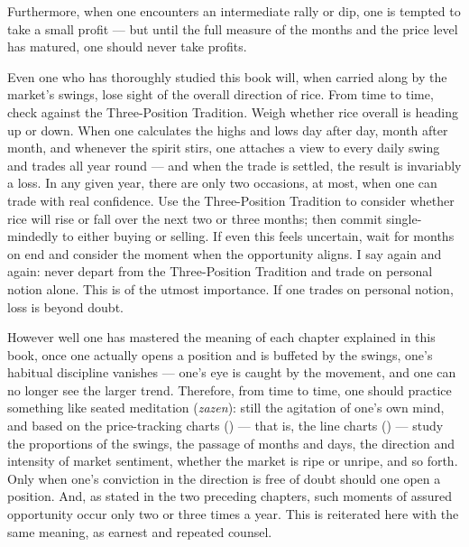 Furthermore, when one encounters an intermediate rally or dip, one is
tempted to take a small profit --- but until the full measure of the
months and the price level has matured, one should never take profits.


\begin{sokyubox}
{\small\itshape\color{sokyubar} }

\medskip
Even one who has thoroughly studied this book will, when carried along by
the market's swings, lose sight of the overall direction of rice. From
time to time, check against the Three-Position Tradition. Weigh whether
rice overall is heading up or down. When one calculates the highs and
lows day after day, month after month, and whenever the spirit stirs, one
attaches a view to every daily swing and trades all year round --- and
when the trade is settled, the result is invariably a loss. In any given
year, there are only two occasions, at most, when one can trade with real
confidence. Use the Three-Position Tradition to consider whether rice
will rise or fall over the next two or three months; then commit
single-mindedly to either buying or selling. If even this feels
uncertain, wait for months on end and consider the moment when the
opportunity aligns. I say again and again: never depart from the
Three-Position Tradition and trade on personal notion alone. This is of
the utmost importance. If one trades on personal notion, loss is beyond
doubt.
\end{sokyubox}

\commentary
However well one has mastered the meaning of each chapter explained in
this book, once one actually opens a position and is buffeted by the
swings, one's habitual discipline vanishes --- one's eye is caught by the
movement, and one can no longer see the larger trend. Therefore, from
time to time, one should practice something like seated meditation
(\textit{zazen}): still the agitation of one's own mind, and based on
the price-tracking charts () --- that is, the
line charts () --- study the proportions of the
swings, the passage of months and days, the direction and intensity of
market sentiment, whether the market is ripe or unripe, and so forth.
Only when one's conviction in the direction is free of doubt should one
open a position. And, as stated in the two preceding chapters, such
moments of assured opportunity occur only two or three times a year. This
is reiterated here with the same meaning, as earnest and repeated
counsel.

